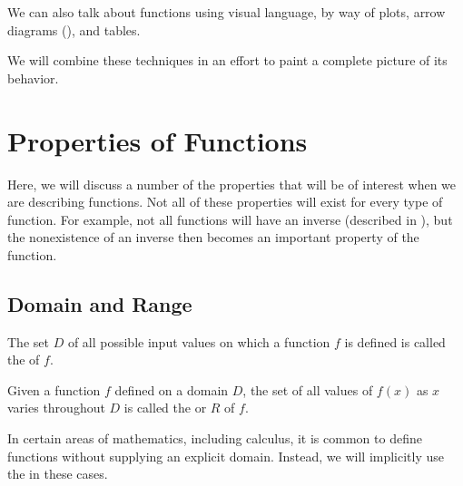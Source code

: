 We can also talk about functions using visual language,
by way of plots,
arrow diagrams (),
and tables.


We will combine these techniques in an effort to paint a complete picture of its 
behavior.

\section{Properties of Functions}

Here, we will discuss a number of the properties that will be of interest when we
are describing functions.
Not all of these properties will exist for every type of function.
For example, not all functions will have an inverse 
(described in ), 
but the nonexistence of an inverse then becomes an important property of the 
function. %

\subsection{Domain and Range}

\begin{defn}[domain]
  The set $D$ of all possible input values on which a function $f$ is defined
  is called the  of $f$.
\end{defn}

\begin{defn}[range]
  Given a function $f$ defined on a domain $D$,
  the set of all values of $f(x)$
  as $x$ varies throughout $D$ is called
  the  or
   $R$ of $f$.
\end{defn}

In certain areas of mathematics, including calculus,
it is common to define functions without supplying an explicit domain.
Instead, we will implicitly use the
in these cases.

